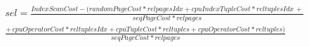 \begin{equation}
    \begin{array}{cc}
         sel = \frac{IndexScanCost - (randomPageCost * relpagesIdx + cpuIndexTupleCost * reltuplesIdx \, +}{seqPageCost * relpages} \\
         \frac{+ \, cpuOperatorCost * reltuplesIdx + cpuTupleCost * reltuples + cpuOperatorCost * reltuples)}{seqPageCost * relpages}
    \end{array}
\end{equation}

